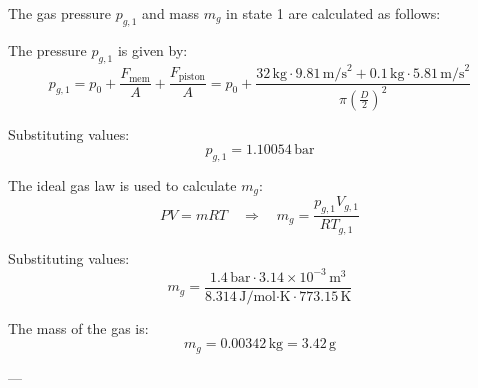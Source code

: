 The gas pressure \( p_{g,1} \) and mass \( m_g \) in state 1 are calculated as follows:  

The pressure \( p_{g,1} \) is given by:  
\[
p_{g,1} = p_0 + \frac{F_{\text{mem}}}{A} + \frac{F_{\text{piston}}}{A} = p_0 + \frac{32 \, \text{kg} \cdot 9.81 \, \text{m/s}^2 + 0.1 \, \text{kg} \cdot 5.81 \, \text{m/s}^2}{\pi \left(\frac{D}{2}\right)^2}
\]  

Substituting values:  
\[
p_{g,1} = 1.10054 \, \text{bar}
\]  

The ideal gas law is used to calculate \( m_g \):  
\[
PV = mRT \quad \Rightarrow \quad m_g = \frac{p_{g,1} V_{g,1}}{R T_{g,1}}
\]  

Substituting values:  
\[
m_g = \frac{1.4 \, \text{bar} \cdot 3.14 \times 10^{-3} \, \text{m}^3}{8.314 \, \text{J/mol·K} \cdot 773.15 \, \text{K}}
\]  

The mass of the gas is:  
\[
m_g = 0.00342 \, \text{kg} = 3.42 \, \text{g}
\]  

---